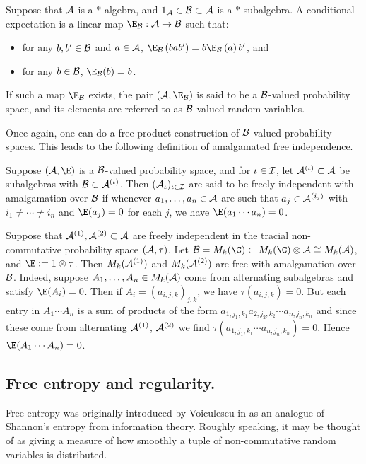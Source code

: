 \begin{definition}
	Suppose that $\mathcal{A}$ is a $*$-algebra, and $1_{\mathcal{A}} \in \mathcal{B} \subset \mathcal{A}$ is a $*$-subalgebra.
	A conditional expectation is a linear map $\E_\cB : \A \to \cB$ such that:
	\begin{itemize}
		\item for any $b, b' \in \mathcal{B}$ and $a \in \mathcal{A}$, $\E_\cB\paren{bab'} = b\E_\cB\paren{a}b'$, and
		\item for any $b \in \mathcal{B}$, $\E_\cB(b) = b$.
	\end{itemize}

	If such a map $\E_\cB$ exists, the pair $(\A, \E_\cB)$ is said to be a $\mathcal{B}$-valued probability space, and its elements are referred to as $\mathcal{B}$-valued random variables.
\end{definition}

Once again, one can do a free product construction of $\mathcal{B}$-valued probability spaces.
This leads to the following definition of amalgamated free independence.
\begin{definition}
	Suppose $(\A, \E)$ is a $\mathcal{B}$-valued probability space, and for $\iota\in\mathcal{I}$, let $\mathcal{A}^{(\iota)} \subset \mathcal{A}$ be subalgebras with $\mathcal{B} \subset \mathcal{A}^{(\iota)}$.
	Then $(\mathcal{A}_\iota)_{\iota\in\mathcal{I}}$ are said to be freely independent with amalgamation over $\mathcal{B}$ if whenever $a_1, \ldots, a_n \in \mathcal{A}$ are such that $a_j \in \mathcal{A}^{(i_j)}$ with $i_1 \neq \cdots \neq i_n$ and $\E(a_j) = 0$ for each $j$, we have $\E(a_1\cdots a_n) = 0$.
\end{definition}

\begin{example}
	Suppose that $\mathcal{A}^{(1)}, \mathcal{A}^{(2)} \subset \mathcal{A}$ are freely independent in the tracial non-commutative probability space $(\mathcal{A}, \tau)$.
	Let $\cB = M_k(\C) \subset M_k(\C)\otimes \A \cong M_k(\A)$, and $\E := 1\otimes\tau$.
	Then $M_k(\mathcal{A}^{(1)})$ and $M_k(\mathcal{A}^{(2)})$ are free with amalgamation over $\mathcal{B}$.
	Indeed, suppose $A_1, \ldots, A_n \in M_k(\mathcal{A})$ come from alternating subalgebras and satisfy $\E(A_i) = 0$.
	Then if $A_i = (a_{i;j,k})_{j,k}$, we have $\tau(a_{i;j,k}) = 0$.
	But each entry in $A_1\cdots A_n$ is a sum of products of the form $a_{1;j_1, k_1}a_{2;j_2,k_2}\cdots a_{n;j_n, k_n}$ and since these come from alternating $\mathcal{A}^{(1)}$, $\mathcal{A}^{(2)}$ we find $\tau(a_{1;j_1,k_1}\cdots a_{n; j_n,k_n}) = 0$.
	Hence $\E(A_1\cdots A_n) = 0$.
\end{example}

\subsection{Free entropy and regularity.}
\label{ss:freeentropyintro}
Free entropy was originally introduced by Voiculescu in \cite{voiculescu1993fisher} as an analogue of Shannon's entropy from information theory.
Roughly speaking, it may be thought of as giving a measure of how smoothly a tuple of non-commutative random variables is distributed.

